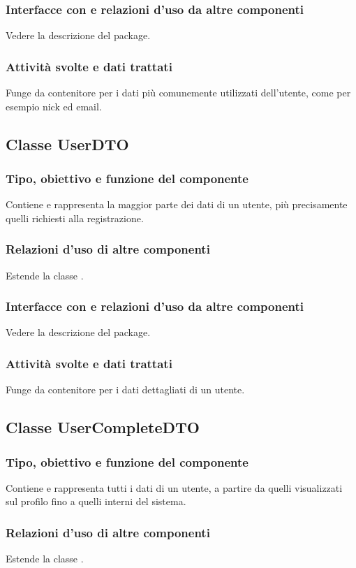 \subsubsection*{Interfacce con e relazioni d'uso da altre componenti}
Vedere la descrizione del package.
\subsubsection*{Attivit\`a svolte e dati trattati}
Funge da contenitore per i dati pi\`u comunemente utilizzati dell'utente, come
per esempio nick ed email.

\subsection{Classe UserDTO}
\subsubsection*{Tipo, obiettivo e funzione del componente}
Contiene e rappresenta la maggior parte dei dati di un utente, pi\`u
precisamente quelli richiesti alla registrazione.
\subsubsection*{Relazioni d'uso di altre componenti}
Estende la classe .
\subsubsection*{Interfacce con e relazioni d'uso da altre componenti}
Vedere la descrizione del package.
\subsubsection*{Attivit\`a svolte e dati trattati}
Funge da contenitore per i dati dettagliati di un utente.

\subsection{Classe UserCompleteDTO}
\subsubsection*{Tipo, obiettivo e funzione del componente}
Contiene e rappresenta tutti i dati di un utente, a partire da quelli
visualizzati sul profilo fino a quelli interni del sistema.
\subsubsection*{Relazioni d'uso di altre componenti}
Estende la classe .
